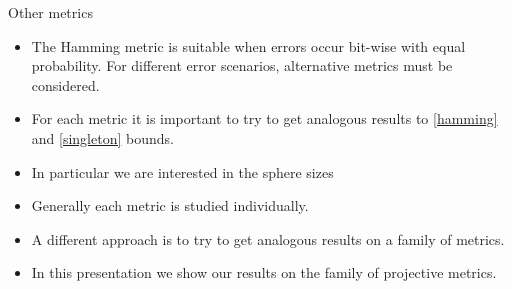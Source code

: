 \begin{frame}{Other metrics}
   \begin{itemize}
   \item The Hamming metric is suitable when errors occur bit-wise with equal probability. For different error scenarios, alternative metrics must be considered. 
   \pause
   \item
   For each metric it is important to try to get analogous results to \ref{hamming}  and \ref{singleton} bounds. 
   \pause
   \item In particular we are interested in the sphere sizes
   \pause
   \item
   Generally each metric is studied individually.
   \pause
   \item
   A different approach is to try to get analogous results on a family of metrics.
   \pause
   \item In this presentation we show our results on the family of projective metrics.
   \end{itemize}
\end{frame}